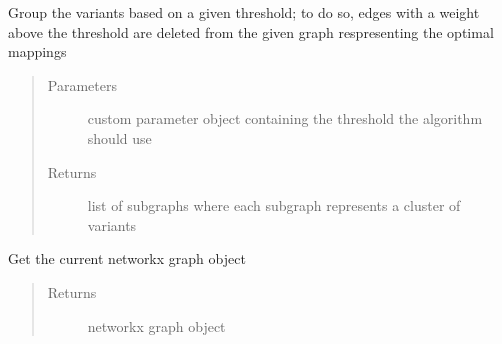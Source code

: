 \documentclass[letterpaper,10pt,english]{sphinxmanual}
\begin{document}
\begin{fulllineitems}
\begin{fulllineitems}
\begin{quote}
\begin{description}
\end{description}\end{quote}

\end{fulllineitems}


\begin{fulllineitems}
\label{\detokenize{graph:graph.graphTool.graphTool.clusterDetection}}
Group the variants based on a given threshold; to do so, edges with a weight above the threshold are deleted from the given graph respresenting the optimal mappings
\begin{quote}\begin{description}
\item[{Parameters}] \leavevmode
{} \textendash{} custom parameter object containing the threshold the algorithm should use

\item[{Returns}] \leavevmode
list of subgraphs where each subgraph represents a cluster of variants

\end{description}\end{quote}

\end{fulllineitems}


\begin{fulllineitems}
\label{\detokenize{graph:graph.graphTool.graphTool.getGraph}}
Get the current networkx graph object
\begin{quote}\begin{description}
\item[{Returns}] \leavevmode
networkx graph object

\end{description}\end{quote}

\end{fulllineitems}



\end{fulllineitems}
\end{document}
